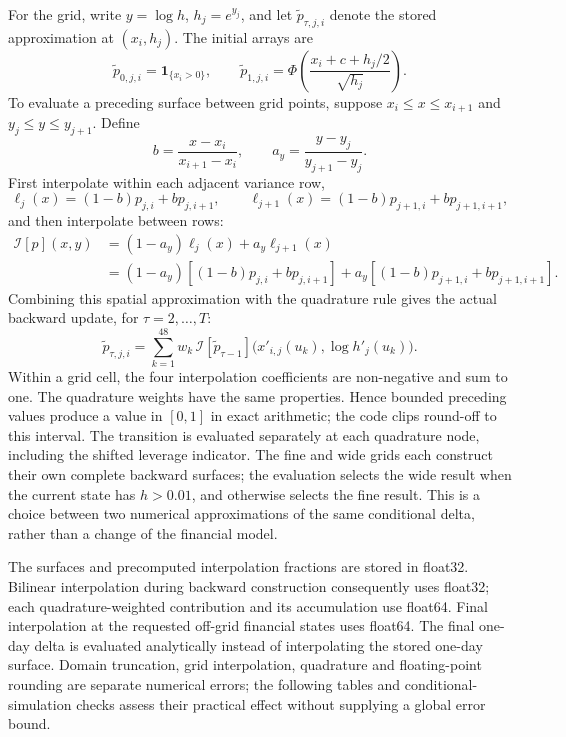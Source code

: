 \documentclass[11pt,a4paper]{article}
\newcommand{\ind}{\mathbf 1}
\theoremstyle{remark}
\begin{document}
For the grid, write $y=\log h$, $h_j=e^{y_j}$, and let $\widetilde p_{\tau,j,i}$ denote the stored approximation at $(x_i,h_j)$. The initial arrays are
\begin{equation}
 \widetilde p_{0,j,i}=\ind_{\{x_i>0\}},\qquad
 \widetilde p_{1,j,i}=\Phi\!\left(\frac{x_i+c+h_j/2}{\sqrt{h_j}}\right).
\end{equation}
To evaluate a preceding surface between grid points, suppose $x_i\leq x\leq x_{i+1}$ and $y_j\leq y\leq y_{j+1}$. Define
\begin{equation}
 b=\frac{x-x_i}{x_{i+1}-x_i},\qquad
 a_y=\frac{y-y_j}{y_{j+1}-y_j}.
\end{equation}
First interpolate within each adjacent variance row,
\begin{equation}
 \ell_j(x)=(1-b)p_{j,i}+bp_{j,i+1},\qquad
 \ell_{j+1}(x)=(1-b)p_{j+1,i}+bp_{j+1,i+1},
\end{equation}
and then interpolate between rows:
\begin{align}
 \mathcal I[p](x,y)
 &=(1-a_y)\ell_j(x)+a_y\ell_{j+1}(x)\nonumber\\
 &=(1-a_y)[(1-b)p_{j,i}+bp_{j,i+1}]
   +a_y[(1-b)p_{j+1,i}+bp_{j+1,i+1}].
 \label{eq:interpolation}
\end{align}
Combining this spatial approximation with the quadrature rule gives the actual backward update, for $\tau=2,\ldots,T$:
\begin{equation}
 \widetilde p_{\tau,j,i}
 =\sum_{k=1}^{48}w_k\,
   \mathcal I[\widetilde p_{\tau-1}]
       \bigl(x'_{i,j}(u_k),\log h'_j(u_k)\bigr).
 \label{eq:quadrature}
\end{equation}
Within a grid cell, the four interpolation coefficients are non-negative and sum to one. The quadrature weights have the same properties. Hence bounded preceding values produce a value in $[0,1]$ in exact arithmetic; the code clips round-off to this interval. The transition is evaluated separately at each quadrature node, including the shifted leverage indicator. The fine and wide grids each construct their own complete backward surfaces; the evaluation selects the wide result when the current state has $h>0.01$, and otherwise selects the fine result. This is a choice between two numerical approximations of the same conditional delta, rather than a change of the financial model.

The surfaces and precomputed interpolation fractions are stored in float32. Bilinear interpolation during backward construction consequently uses float32; each quadrature-weighted contribution and its accumulation use float64. Final interpolation at the requested off-grid financial states uses float64. The final one-day delta is evaluated analytically instead of interpolating the stored one-day surface. Domain truncation, grid interpolation, quadrature and floating-point rounding are separate numerical errors; the following tables and conditional-simulation checks assess their practical effect without supplying a global error bound.
\end{document}
